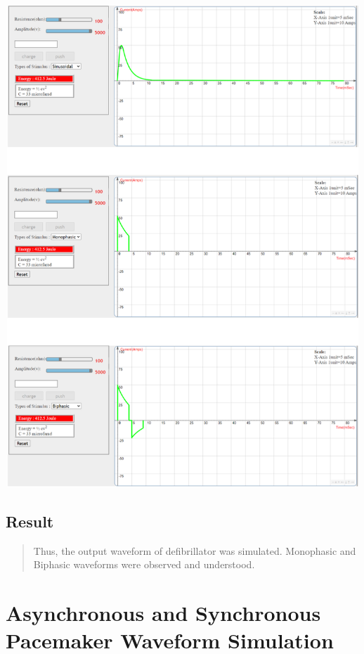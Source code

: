\documentclass[
  11pt,
  letterpaper,
  DIV=11,
  numbers=noendperiod]{scrreprt}
\begin{document}
\begin{center}
\includegraphics[width=5.375in,height=7.13542in]{images/clipboard-2000378057.png}
\end{center}

\section{Result}\label{result-6}

\begin{quote}
Thus, the output waveform of defibrillator was simulated. Monophasic and
Biphasic waveforms were observed and understood.
\end{quote}


\chapter{Asynchronous and Synchronous Pacemaker Waveform
Simulation}\label{asynchronous-and-synchronous-pacemaker-waveform-simulation}
\end{document}
